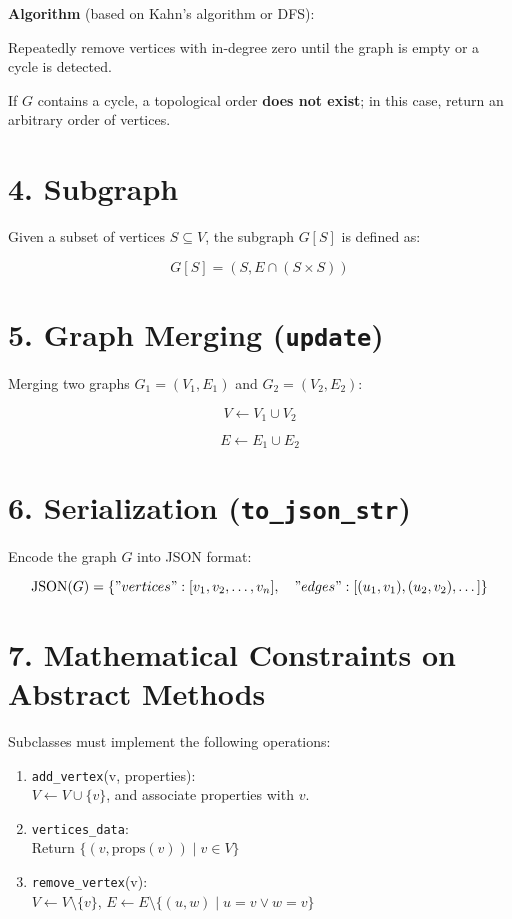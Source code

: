 \documentclass{article}
\begin{document}
\textbf{Algorithm} (based on Kahn's algorithm or DFS):

Repeatedly remove vertices with in-degree zero until the graph is empty or a cycle is detected.

If $G$ contains a cycle, a topological order \textbf{does not exist}; in this case, return an arbitrary order of vertices.
\section*{4. Subgraph}

Given a subset of vertices $S \subseteq V$, the subgraph $G[S]$ is defined as:

\[
G[S] = (S, E \cap (S \times S))
\]

\section*{5. Graph Merging (\texttt{update})}

Merging two graphs $G_1 = (V_1, E_1)$ and $G_2 = (V_2, E_2)$:

\[
V \leftarrow V_1 \cup V_2
\]

\[
E \leftarrow E_1 \cup E_2
\]
\section*{6. Serialization (\texttt{to\_json\_str})}

Encode the graph $G$ into JSON format:

\[
\text{JSON}(G) = \{"vertices": [v_1, v_2, \dots, v_n], \quad "edges": [(u_1, v_1), (u_2, v_2), \dots]\}
\]

\section*{7. Mathematical Constraints on Abstract Methods}

Subclasses must implement the following operations:

\begin{enumerate}
    \item \texttt{add\_vertex}(v, properties): \\
    $V \leftarrow V \cup \{v\}$, and associate properties with $v$.
    
    \item \texttt{vertices\_data}: \\
    Return $\{(v, \text{props}(v)) \mid v \in V\}$
    
    \item \texttt{remove\_vertex}(v): \\
    $V \leftarrow V \setminus \{v\}$, \quad $E \leftarrow E \setminus \{(u, w) \mid u = v \lor w = v\}$
\end{enumerate}
\end{document}
